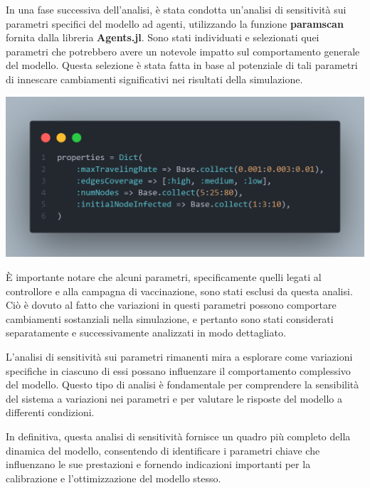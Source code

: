 In una fase successiva dell'analisi, è stata condotta un'analisi di 
sensitività sui parametri specifici del modello ad agenti, 
utilizzando la funzione \textbf{paramscan} fornita dalla libreria 
\textbf{Agents.jl}. Sono stati individuati e selezionati quei 
parametri che potrebbero avere un notevole impatto sul comportamento 
generale del modello. Questa selezione è stata fatta in base al 
potenziale di tali parametri di innescare cambiamenti significativi nei 
risultati della simulazione.

\begin{minipage}{\linewidth}
	\centering
	\includegraphics[width=\textwidth]{img/paramscan.png}
	\label{fig:paramscan}
\end{minipage}

È importante notare che alcuni parametri, specificamente quelli 
legati al controllore e alla campagna di vaccinazione, sono stati 
esclusi da questa analisi. Ciò è dovuto al fatto che variazioni in 
questi parametri possono comportare cambiamenti sostanziali nella 
simulazione, e pertanto sono stati considerati separatamente e 
successivamente analizzati in modo dettagliato.

L'analisi di sensitività sui parametri rimanenti mira a esplorare 
come variazioni specifiche in ciascuno di essi possano influenzare 
il comportamento complessivo del modello. Questo tipo di analisi è 
fondamentale per comprendere la sensibilità del sistema a variazioni 
nei parametri e per valutare le risposte del modello a differenti 
condizioni.

In definitiva, questa analisi di sensitività fornisce un quadro più 
completo della dinamica del modello, consentendo di identificare i 
parametri chiave che influenzano le sue prestazioni e fornendo 
indicazioni importanti per la calibrazione e l'ottimizzazione del 
modello stesso.
\newpage

